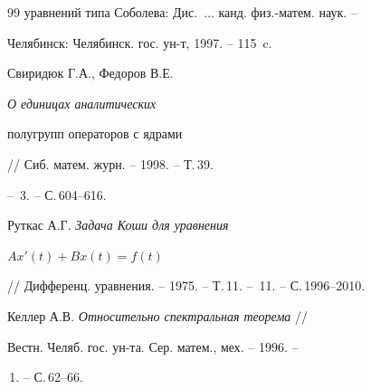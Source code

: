 \begin{thebibliography}{99}
{уравнений типа Соболева}: Дис.~$\dotsc$ канд. физ.-матем. наук. --


Челябинск: Челябинск. гос. ун-т, 1997. -- 115~c.




Свиридюк Г.А., Федоров В.Е. {\it О единицах аналитических


полугрупп операторов с ядрами} // Сиб. матем. журн. -- 1998. -- Т.\,39.


-- \No\,3. -- С.\,604--616.




Руткас А.Г. {\it Задача Коши для уравнения}


$Ax'(t)+Bx(t)=f(t)$


// Дифференц. уравнения. -- 1975. -- Т.\,11. -- \No\,11. -- С.\,1996--2010.




Келлер А.В. {\it Относительно спектральная теорема} //


Вестн. Челяб. гос. ун-та. Сер. матем., мех. -- 1996. --


\No\,1. -- С.\,62--66.





\end{thebibliography}





\vskip 2cm














\label{end}





